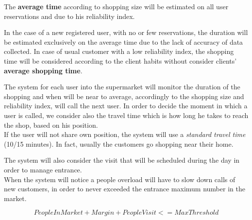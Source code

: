 The \textbf{average time} according to shopping size will be estimated on all user reservations and  due to his reliability index.

 

In the case of a new registered user, with no or few reservations, the duration will be estimated exclusively on the average time due to the lack of accuracy of data collected.
In case of usual customer with a low reliability index, the shopping time will be considered according to the client habits without consider clients' \textbf{average shopping time}.

 

The system for each user into the supermarket will monitor the duration of the shopping and when will be near to average, accordingly to the shopping size and reliability index, will call the next user. In order to decide the moment in which a user is called, we consider also the travel time which is how long he takes to reach the shop, based on his position.\\
If the user will not share own position, the system will use a \textit{standard travel time} (10/15 minutes). In fact, usually the customers go shopping near their home.

 

The system will also consider the visit that will be scheduled during the day in order to manage entrance.\\
When the system will notice a people overload will have to slow down calls of new customers, in order to never exceeded the entrance maximum number in the market. 
  
\[PeopleInMarket + Margin + PeopleVisit <= MaxThreshold\]



